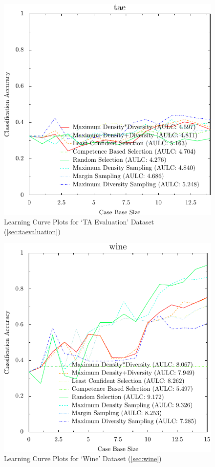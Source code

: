 \documentclass[a4paper,11pt]{report}
\begin{document}
\begin{figure}[h!]
\includegraphics{./Plots/tae}
\caption{Learning Curve Plots for `TA Evaluation' Dataset (\ref{sec:taevaluation})}
\end{figure}

\begin{figure}[h!]
\includegraphics{./Plots/wine}
\caption{Learning Curve Plots for `Wine' Dataset (\ref{sec:wine})}
\end{figure}
\end{document}
